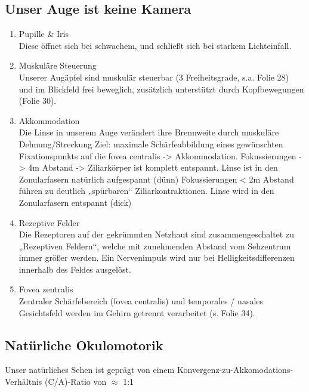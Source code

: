 \subsection{Unser Auge ist keine Kamera}
\begin{enumerate}
\item Pupille \& Iris\\
Diese öffnet sich bei schwachem, und schließt sich bei starkem Lichteinfall.

\item Muskuläre Steuerung\\
Unserer Augäpfel sind muskulär steuerbar (3 Freiheitsgrade,
s.a. Folie 28) und im Blickfeld frei beweglich, zusätzlich
unterstützt durch Kopfbewegungen (Folie 30).

\item Akkommodation\\
Die Linse in unserem Auge verändert ihre Brennweite durch muskuläre Dehnung/Streckung
Ziel: maximale Schärfeabbildung eines gewünschten Fixationspunkts auf die fovea centralis -> Akkommodation.
Fokussierungen -> 4m Abstand -> Ziliarkörper ist komplett entspannt. Linse ist in den Zonularfasern natürlich aufgespannt (dünn)
Fokussierungen < 2m Abstand führen zu deutlich „spürbaren“ Ziliarkontraktionen. Linse wird in den Zonularfasern entspannt (dick)

\item Rezeptive Felder\\
Die Rezeptoren auf der gekrümmten
Netzhaut sind zusammengeschaltet zu
„Rezeptiven Feldern“, welche mit zunehmenden
Abstand vom Sehzentrum
immer größer werden. Ein Nervenimpuls
wird nur bei Helligkeitsdifferenzen innerhalb
des Feldes ausgelöst.


\item Fovea zentralis\\
Zentraler Schärfebereich (fovea
centralis) und temporales / nasales
Gesichtsfeld werden im Gehirn
getrennt verarbeitet (s. Folie 34).

\end{enumerate}


\subsection{Natürliche Okulomotorik}

Unser natürliches Sehen ist geprägt von einem Konvergenz-zu-Akkomodations-Verhältnis (C/A)-Ratio von $\approx$ 1:1

